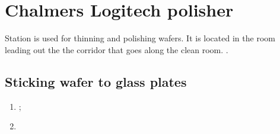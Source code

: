 \section{Chalmers Logitech polisher}
  Station is used for thinning and polishing wafers. It is located in the room leading out the the corridor that goes along the clean room. .
  
  \subsection{Sticking wafer to glass plates}
  \begin{enumerate}
  	\item {};
  	\item {}
  \end{enumerate}
 
